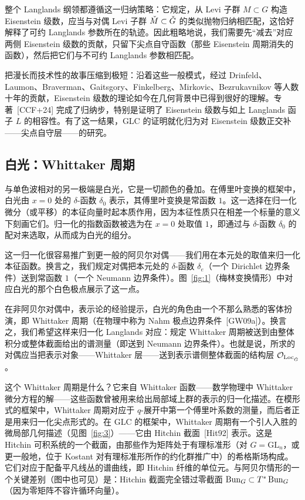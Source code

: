 整个 Langlands 纲领都遵循这一归纳策略：它规定，从 Levi 子群 $M\subset G$ 构造 Eisenstein 级数，应当与对偶 Levi 子群 $\check M\subset\check{G}$ 的类似抛物归纳相匹配，这恰好解释了可约 Langlands 参数所在的轨迹。因此粗略地说，我们需要先“减去”对应两侧 Eisenstein 级数的贡献，只留下尖点自守函数（那些 Eisenstein 周期消失的函数），然后把它们与不可约 Langlands 参数相匹配。

把漫长而技术性的故事压缩到极短：沿着这些一般模式，经过 Drinfeld、Laumon、Braverman、Gaitsgory、Finkelberg、Mirkovic、Bezrukavnikov 等人数十年的贡献，Eisenstein 级数的理论如今在几何背景中已得到很好的理解。专著~[CCF+24] 完成了归纳步，特别是证明了 Eisenstein 级数与如上 Langlands 函子 $L$ 的相容性。有了这一结果，GLC 的证明就化归为对 Eisenstein 级数正交补——尖点自守层——的研究。

\subsection{白光：Whittaker 周期}\label{sec:5.4}

与单色波相对的另一极端是白光，它是一切颜色的叠加。在傅里叶变换的框架中，白光由 $x=0$ 处的 $\delta$-函数 $\delta_{0}$ 表示，其傅里叶变换是常函数 $1$。这一选择在归一化微分（或平移）的本征向量时起本质作用，因为本征性质只在相差一个标量的意义下刻画它们。归一化的指数函数被选为在 $x=0$ 处取值 $1$，即通过与 $\delta$-函数 $\delta_{0}$ 的配对来选取，从而成为白光的组分。

这一归一化很容易推广到更一般的阿贝尔对偶——我们用在本元处的取值来归一化本征函数。换言之，我们规定对偶把本元处的 $\delta$-函数 $\delta_{e}$（一个 Dirichlet 边界条件）送到常函数 $1$（一个 Neumann 边界条件）。图~\ref{fig:1}（梅林变换情形）中对应白光的那个白色极点展示了这一点。

在非阿贝尔对偶中，表示论的经验提示，白光的角色由一个不那么熟悉的客体扮演，即 Whittaker 周期（在物理中称为 Nahm 极点边界条件~[GW09a]）。换言之，我们希望这样来归一化 Langlands 对应：规定 Whittaker 周期被送到由整体积分或整体截面给出的谱测量（即送到 Neumann 边界条件）。也就是说，所求的对偶应当把表示对象——Whittaker 层——送到表示谱侧整体截面的结构层 $\mathcal{O}_{\operatorname{Loc}_{\check{G}}}$。

这个 Whittaker 周期是什么？它来自 Whittaker 函数——数学物理中 Whittaker 微分方程的解——这些函数曾被用来给出局部域上群的表示的归一化描述。在模形式的框架中，Whittaker 周期对应于 $q$-展开中第一个傅里叶系数的测量，而后者正是用来归一化尖点形式的。在 GLC 的框架中，Whittaker 周期有一个引人入胜的微局部几何描述（见图~\ref{fig:3}）——它由 Hitchin 截面~[Hit92] 表示。这是 Hitchin 可积系统的一个截面，由那些作为矩阵处于有理标准形（对 $G=\mathrm{GL}_{n}$，或更一般地，位于 Kostant 对有理标准形所作的约化群推广中）的希格斯场构成。它们对应于配备平凡线丛的谱曲线，即 Hitchin 纤维的单位元。与阿贝尔情形的一个关键差别（图中也可见）是：Hitchin 截面完全错过零截面 $\operatorname{Bun}_{G}\subset T^{*}\operatorname{Bun}_{G}$（因为零矩阵不容许循环向量）。


